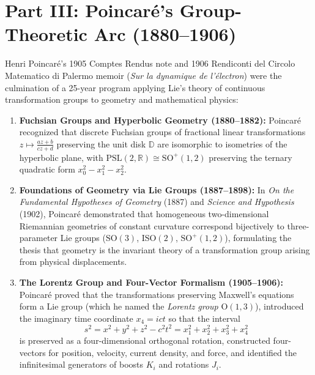 \documentclass[11pt]{article}
\begin{document}
\section{Part III: Poincar\'e's Group-Theoretic Arc (1880--1906)}
Henri Poincar\'e's 1905 Comptes Rendus note and 1906 Rendiconti del Circolo Matematico di Palermo memoir (\emph{Sur la dynamique de l'\'electron}) were the culmination of a 25-year program applying Lie's theory of continuous transformation groups to geometry and mathematical physics:
\begin{enumerate}
  \item \textbf{Fuchsian Groups and Hyperbolic Geometry (1880--1882):} Poincar\'e recognized that discrete Fuchsian groups of fractional linear transformations $z \mapsto \frac{az+b}{cz+d}$ preserving the unit disk $\mathbb{D}$ are isomorphic to isometries of the hyperbolic plane, with $\mathrm{PSL}(2,\mathbb{R}) \cong \mathrm{SO}^+(1,2)$ preserving the ternary quadratic form $x_0^2 - x_1^2 - x_2^2$.
  \item \textbf{Foundations of Geometry via Lie Groups (1887--1898):} In \emph{On the Fundamental Hypotheses of Geometry} (1887) and \emph{Science and Hypothesis} (1902), Poincar\'e demonstrated that homogeneous two-dimensional Riemannian geometries of constant curvature correspond bijectively to three-parameter Lie groups ($\mathrm{SO}(3)$, $\mathrm{ISO}(2)$, $\mathrm{SO}^+(1,2)$), formulating the thesis that geometry is the invariant theory of a transformation group arising from physical displacements.
  \item \textbf{The Lorentz Group and Four-Vector Formalism (1905--1906):} Poincar\'e proved that the transformations preserving Maxwell's equations form a Lie group (which he named the \emph{Lorentz group} $\mathrm{O}(1,3)$), introduced the imaginary time coordinate $x_4 = ict$ so that the interval
  \[
  s^2 = x^2 + y^2 + z^2 - c^2 t^2 = x_1^2 + x_2^2 + x_3^2 + x_4^2
  \]
  is preserved as a four-dimensional orthogonal rotation, constructed four-vectors for position, velocity, current density, and force, and identified the infinitesimal generators of boosts $K_i$ and rotations $J_i$.
\end{enumerate}
\end{document}
